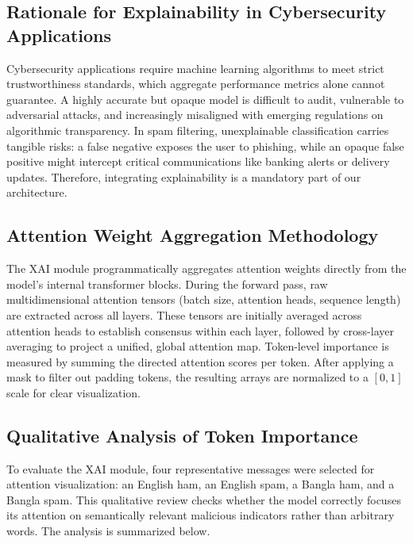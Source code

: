 \documentclass[journal]{IEEEtran}
\begin{document}
\subsection{Rationale for Explainability in Cybersecurity Applications}

Cybersecurity applications require machine learning algorithms to meet strict trustworthiness standards, which aggregate performance metrics alone cannot guarantee. A highly accurate but opaque model is difficult to audit, vulnerable to adversarial attacks, and increasingly misaligned with emerging regulations on algorithmic transparency. In spam filtering, unexplainable classification carries tangible risks: a false negative exposes the user to phishing, while an opaque false positive might intercept critical communications like banking alerts or delivery updates. Therefore, integrating explainability is a mandatory part of our architecture.

\subsection{Attention Weight Aggregation Methodology}

The XAI module programmatically aggregates attention weights directly from the model's internal transformer blocks. During the forward pass, raw multidimensional attention tensors (batch size, attention heads, sequence length) are extracted across all layers. These tensors are initially averaged across attention heads to establish consensus within each layer, followed by cross-layer averaging to project a unified, global attention map. Token-level importance is measured by summing the directed attention scores per token. After applying a mask to filter out padding tokens, the resulting arrays are normalized to a $[0, 1]$ scale for clear visualization.

\subsection{Qualitative Analysis of Token Importance}

To evaluate the XAI module, four representative messages were selected for attention visualization: an English ham, an English spam, a Bangla ham, and a Bangla spam. This qualitative review checks whether the model correctly focuses its attention on semantically relevant malicious indicators rather than arbitrary words. The analysis is summarized below.
\end{document}
